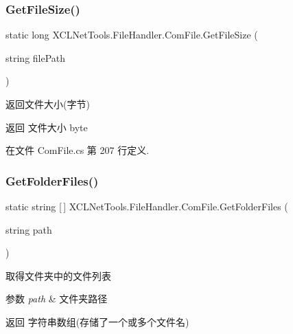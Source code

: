 \subsubsection{\texorpdfstring{Get\+File\+Size()}{GetFileSize()}}
{\footnotesize\ttfamily static long X\+C\+L\+Net\+Tools.\+File\+Handler.\+Com\+File.\+Get\+File\+Size (\begin{DoxyParamCaption}\item[{string}]{file\+Path }\end{DoxyParamCaption})\hspace{0.3cm}{\ttfamily [static]}}



返回文件大小(字节) 

\begin{DoxyReturn}{返回}
文件大小 byte
\end{DoxyReturn}


在文件 Com\+File.\+cs 第 207 行定义.

\mbox{\label{class_x_c_l_net_tools_1_1_file_handler_1_1_com_file_ae82ff285ff8d522f3d6096c26e70ce40}} 
\subsubsection{\texorpdfstring{Get\+Folder\+Files()}{GetFolderFiles()}}
{\footnotesize\ttfamily static string \mbox{[}$\,$\mbox{]} X\+C\+L\+Net\+Tools.\+File\+Handler.\+Com\+File.\+Get\+Folder\+Files (\begin{DoxyParamCaption}\item[{string}]{path }\end{DoxyParamCaption})\hspace{0.3cm}{\ttfamily [static]}}



取得文件夹中的文件列表 


\begin{DoxyParams}{参数}
{\em path} & 文件夹路径\\
\hline
\end{DoxyParams}
\begin{DoxyReturn}{返回}
字符串数组(存储了一个或多个文件名)
\end{DoxyReturn}


